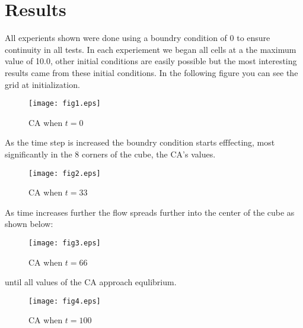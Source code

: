 \documentclass[11pt,twocolumn]{article}
\begin{document}
\section{Results}
All experients shown were done using a boundry condition of 0 to ensure continuity in all tests. In each experiement we began all cells at a the maximum value of 10.0, other initial conditions are easily possible but the most interesting results came from these initial conditions. In the following figure you can see the grid at initialization.
\begin{figure}[ht!]
\centering
\caption{CA when $t=0$}
\texttt{[image: fig1.eps]}
\end{figure}

\vspace{7mm}

As the time step is increased the boundry condition starts efffecting, most significantly in the 8 corners of the cube, the CA's values.
 

\begin{figure}[ht!]
\centering
\caption{CA when $t=33$}
\texttt{[image: fig2.eps]}
\end{figure}

\vspace{7mm}

As time increases further the flow spreads further into the center of the cube as shown below:

\vspace{5mm}

\begin{figure}[ht!]
\centering
\caption{CA when $t=66$}
\texttt{[image: fig3.eps]}
\end{figure}

\vspace{100mm}

until all values of the CA approach equlibrium.

\begin{figure}[ht!]
\centering
\caption{CA when $t=100$}
\texttt{[image: fig4.eps]}
\end{figure}

\vspace{5mm}
\end{document}
